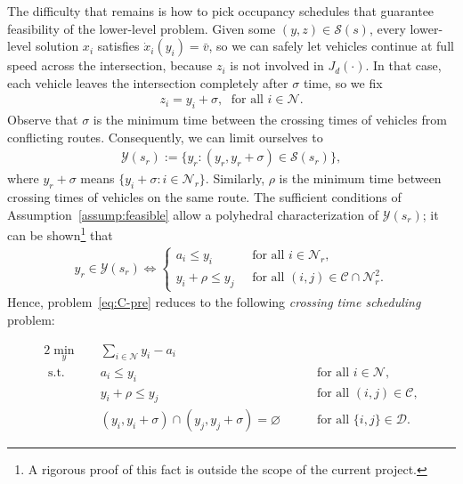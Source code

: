 \documentclass[a4paper]{report}
\theoremstyle{definition}
\theoremstyle{plain}
\begin{document}
The difficulty that remains is how to pick occupancy schedules that guarantee
feasibility of the lower-level problem.
%
Given some $(y,z) \in \mathcal{S}(s)$, every lower-level solution $x_{i}$
satisfies $\dot{x}_{i}(y_{i}) = \bar{v}$, so we can safely let vehicles continue
at full speed across the intersection, because $z_{i}$ is not involved in
$J_d(\cdot)$.
%
In that case, each vehicle leaves the intersection completely after
$\sigma$ time, so we fix
\begin{align*}
  z_{i} = y_{i} + \sigma, \; \text{ for all } i \in \mathcal{N} .
\end{align*}
%
Observe that $\sigma$ is the minimum time between the crossing times of
vehicles from conflicting routes.
%
Consequently, we can limit ourselves to
\begin{align}
  \label{eq:1}
  \mathcal{Y}(s_{r}) := \{ y_{r} : (y_{r}, y_{r} + \sigma) \in \mathcal{S}(s_{r}) \} ,
\end{align}
where $y_{r} + \sigma$ means $\{y_{i} + \sigma : i \in \mathcal{N}_{r}\}$.
%
Similarly, $\rho$ is the minimum time between crossing times of vehicles on the
same route.
% 
The sufficient conditions of Assumption~\ref{assump:feasible} allow a polyhedral characterization
of $\mathcal{Y}(s_r)$; it can be shown\footnote{A rigorous proof of this fact is
  outside the scope of the current project.} that
%
\begin{align}\label{eq:feasibility-inequalities}
 y_{r} \in \mathcal{Y}(s_{r}) \iff
 \begin{cases}
  a_{i} \leq y_i & \; \text{ for all } i \in \mathcal{N}_{r} , \\
  y_i + \rho \leq y_j & \; \text{ for all } (i,j) \in \mathcal{C} \cap \mathcal{N}^2_{r} .
  \end{cases}
\end{align}
%
Hence, problem~\eqref{eq:C-pre} reduces to the following \textit{crossing time scheduling} problem:

\begin{mdframed}
\vspace{-\abovedisplayskip}
\begin{alignat}{2}\label{eq:C}
  \min_{y} \quad & \sum_{i \in \mathcal{N}} y_i - a_i \tag{C} \\
  \text{ s.t. } \quad & a_{i} \leq y_i  && \quad \text{ for all } i \in \mathcal{N} , \tag{C.1} \\
                    & y_i + \rho \leq y_{j}  && \quad \text{ for all } (i,j) \in \mathcal{C} \label{eq:conjunctive} , \tag{C.2} \\
                    & (y_{i}, y_i + \sigma) \cap (y_{j}, y_j + \sigma) = \varnothing && \quad \text{ for all } \{i,j\} \in \mathcal{D} \label{eq:disjunctive} \tag{C.3}.
\end{alignat}
\end{mdframed}
\end{document}
